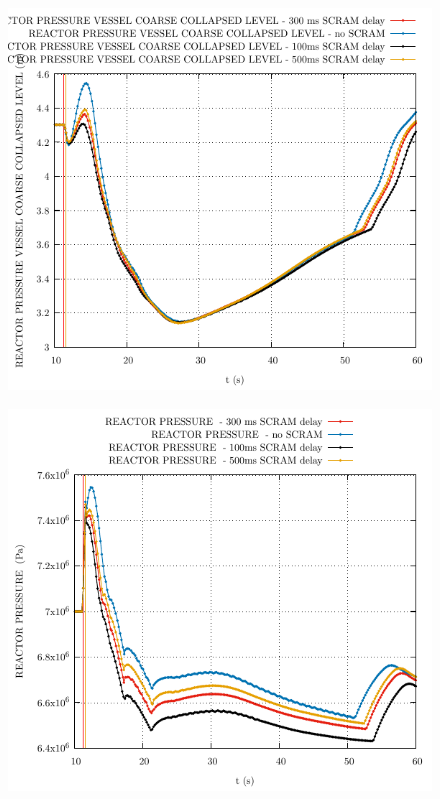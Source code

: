 \documentclass{article}
\begin{document}
\begin{multicols}{2}
\begin{figure}[H]
\end{figure}
\begin{figure}[H]
\centering
\includegraphics[width=\columnwidth]{./graphs/REACTOR PRESSURE VESSEL COARSE COLLAPSED LEVEL_comp.pdf}
\end{figure}
\begin{figure}[H]
\centering
\includegraphics[width=\columnwidth]{./graphs/REACTOR PRESSURE _comp.pdf}

\end{figure}
\end{multicols}
\end{document}
